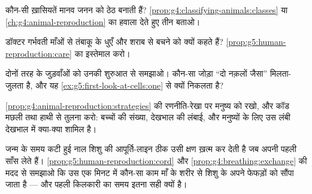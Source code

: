 \begin{exercise}[$\star$]\label{exo:g5:human-reproduction:7}
कौन-सी ख़ासियतें मानव जनन को ठेठ  बनाती हैं?
\cref{prop:g4:classifying-animals:classes} या
\cref{ch:g4:animal-reproduction} का हवाला देते हुए तीन बताओ।
\end{exercise}

\begin{exercise}[$\star$]\label{exo:g5:human-reproduction:8}
डॉक्टर गर्भवती माँओं से तंबाकू के धुएँ और शराब से बचने को क्यों कहते
हैं? \cref{prop:g5:human-reproduction:care} का इस्तेमाल करो।
\end{exercise}

\begin{exercise}[$\star\star$]\label{exo:g5:human-reproduction:9}
दोनों तरह के जुड़वाँओं को उनकी शुरुआत से समझाओ। कौन-सा जोड़ा ``दो
नक़लों जैसा'' मिलता-जुलता है, और यह
\cref{ex:g5:first-look-at-cells:one} से क्यों निकलता है?
\end{exercise}

\begin{exercise}[$\star\star$]\label{exo:g5:human-reproduction:10}
\cref{prop:g4:animal-reproduction:strategies} की रणनीति-रेखा पर मनुष्य
को रखो, और कॉड मछली तथा हाथी से तुलना करो: बच्चों की संख्या, देखभाल की
लंबाई, और मनुष्यों के लिए उस लंबी देखभाल में क्या-क्या शामिल है।
\end{exercise}

\begin{exercise}[$\star\star\star$]\label{exo:g5:human-reproduction:11}
जन्म के समय कटी हुई नाल शिशु की आपूर्ति-लाइन ठीक उसी क्षण ख़त्म कर
देती है जब  अपनी पहली साँस लेते हैं।
\cref{prop:g5:human-reproduction:cord} और
\cref{prop:g4:breathing:exchange} की मदद से समझाओ कि उस एक मिनट में
कौन-सा काम माँ के शरीर से शिशु के अपने फेफड़ों को सौंपा जाता है ---
और पहली किलकारी का समय इतना सही क्यों है।
\end{exercise}
